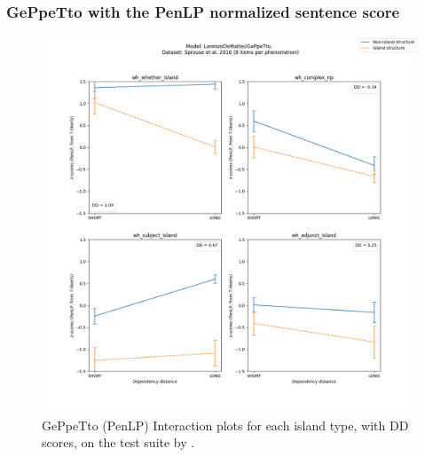 \subsubsection{GePpeTto with the PenLP normalized sentence score}
\begin{figure}[h]
	\centering
	\includegraphics[width=1\textwidth]{images/Chapter1/Sprouse_wh_LorenzoDeMattei_GePpeTto_PenLP-zscores-likert-2022-09-14_h17m23s36.png} 
	\caption{GePpeTto (PenLP) Interaction plots for each island type, with DD scores, on the test suite by \citet{sprouse2016experimental}.}
	\label{fig:sprouse_gpt_penlp} 
	\medskip
\end{figure}	







